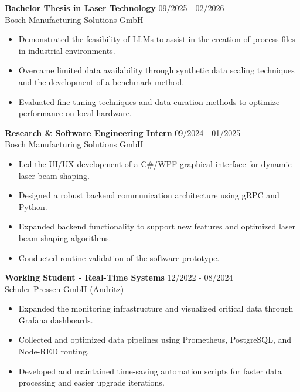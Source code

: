 \documentclass[10pt,a4paper]{article}
\begin{document}
\begin{minipage}[t]{0.66\textwidth}
    \textbf{Bachelor Thesis in Laser Technology} \hfill 09/2025 - 02/2026\\
    Bosch Manufacturing Solutions GmbH
    \vspace{-0.2em}
    \begin{itemize}
        \item Demonstrated the feasibility of LLMs to assist in the creation of process files in industrial environments.
        \item Overcame limited data availability through synthetic data scaling techniques and the development of a benchmark method.
        \item Evaluated fine-tuning techniques and data curation methods to optimize performance on local hardware.
    \end{itemize}
    
    \vspace{0.6em}
    \textbf{Research \& Software Engineering Intern} \hfill 09/2024 - 01/2025\\
    Bosch Manufacturing Solutions GmbH
    \vspace{-0.2em}
    \begin{itemize}
        \item Led the UI/UX development of a C\#/WPF graphical interface for dynamic laser beam shaping.
        \item Designed a robust backend communication architecture using gRPC and Python.
        \item Expanded backend functionality to support new features and optimized laser beam shaping algorithms.
        \item Conducted routine validation of the software prototype.
    \end{itemize}

    \vspace{0.6em}
    \textbf{Working Student - Real-Time Systems} \hfill 12/2022 - 08/2024\\
    Schuler Pressen GmbH (Andritz)
    \vspace{-0.2em}
    \begin{itemize}
        \item Expanded the monitoring infrastructure and visualized critical data through Grafana dashboards.
        \item Collected and optimized data pipelines using Prometheus, PostgreSQL, and Node-RED routing.
        \item Developed and maintained time-saving automation scripts for faster data processing and easier upgrade iterations.
    \end{itemize}

\end{minipage}
\end{document}
